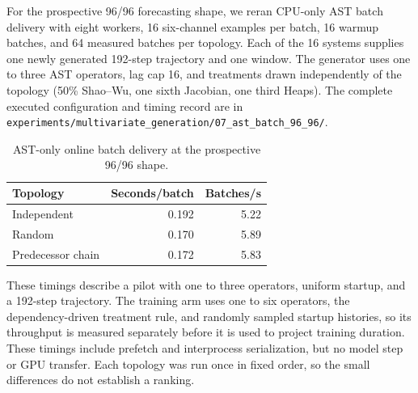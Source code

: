 For the prospective 96/96 forecasting shape, we reran CPU-only AST batch
delivery with eight workers, 16 six-channel examples per batch, 16 warmup
batches, and 64 measured batches per topology. Each of the 16 systems supplies
one newly generated 192-step trajectory and one window. The generator uses
one to three AST operators, lag cap 16, and treatments drawn independently of
the topology (50\% Shao--Wu, one sixth Jacobian, one third Heaps). The complete executed
configuration and timing record are in
\texttt{experiments/multivariate\_generation/07\_ast\_batch\_96\_96/}.
\begin{table}[htbp]\centering
\caption{AST-only online batch delivery at the prospective 96/96 shape.}
\label{tab:ast-batch-96-throughput}
\begin{tabular}{lrr}\hline
Topology & Seconds/batch & Batches/s \\\hline
Independent & 0.192 & 5.22 \\
Random & 0.170 & 5.89 \\
Predecessor chain & 0.172 & 5.83 \\\hline
\end{tabular}\end{table}
These timings describe a pilot with one to three operators, uniform startup,
and a 192-step trajectory. The training arm uses one to six operators, the
dependency-driven treatment rule, and randomly sampled startup histories, so
its throughput is measured separately before it is used to project training
duration. These timings include prefetch and interprocess serialization, but no
model step or GPU transfer. Each topology was run once in fixed order, so the
small differences do not establish a ranking.
